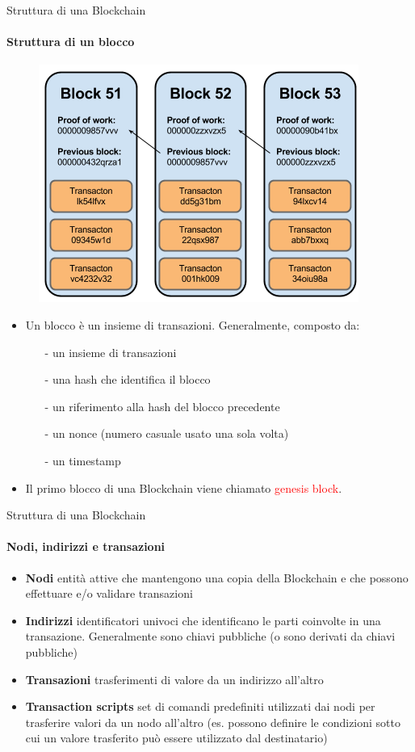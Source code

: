 \documentclass{beamer}
\newcommand\red[1]{\textcolor{red}{#1}}
\begin{document}
  \begin{frame}{Struttura di una Blockchain}
    \framesubtitle{Struttura di un blocco}
        \begin{figure}[!htb]
          \centering
          \includegraphics[width=0.3\linewidth]{../img/blockchain-basic-schema.png}
        \end{figure}
      \begin{itemize}
        \item  Un blocco è un insieme di transazioni. Generalmente, composto da:
        \begin{itemize}
          \item[-] un insieme di transazioni
          \item[-] una hash che identifica il blocco
          \item[-] un riferimento alla hash del blocco precedente
          \item[-] un nonce (numero casuale usato una sola volta)
          \item[-] un timestamp
        \end{itemize}
        \item Il primo blocco di una Blockchain viene chiamato \red{genesis block}.
      \end{itemize}
  \end{frame}




  \begin{frame}{Struttura di una Blockchain}
    \framesubtitle{Nodi, indirizzi e transazioni}
    \begin{itemize}
      \item \textbf{Nodi} entità attive che mantengono una copia della Blockchain e che possono effettuare e/o validare transazioni \pause
      \item \textbf{Indirizzi} identificatori univoci che identificano le parti coinvolte in una transazione. Generalmente sono chiavi pubbliche (o sono derivati da chiavi pubbliche) \pause
      \item \textbf{Transazioni} trasferimenti di valore da un indirizzo all'altro \pause
      \item \textbf{Transaction scripts} set di comandi predefiniti utilizzati dai nodi per trasferire valori da un nodo all'altro (es. possono definire le condizioni sotto cui un valore trasferito può essere utilizzato dal destinatario)
    \end{itemize}
  \end{frame}
\end{document}
